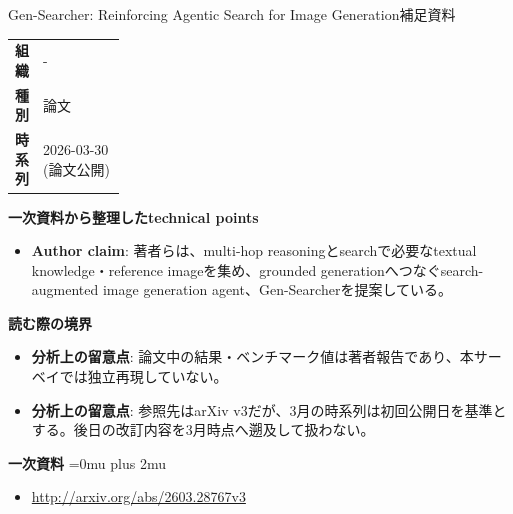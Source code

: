 \begin{technicalnote}{Gen-Searcher: Reinforcing Agentic Search for Image Generation}{補足資料}
\begingroup
\begin{tabularx}{\linewidth}{@{}>{\bfseries}p{0.22\linewidth}X@{}}
組織 & - \\
種別 & 論文 \\
時系列 & 2026-03-30 (論文公開) \\
\end{tabularx}
\smallskip
{\bfseries 一次資料から整理したtechnical points}
\begin{itemize}[leftmargin=1.5em,itemsep=0.35em]
\item \textbf{Author claim}: 著者らは、multi-hop reasoningとsearchで必要なtextual knowledge・reference imageを集め、grounded generationへつなぐsearch-augmented image generation agent、Gen-Searcherを提案している。
\end{itemize}
\begin{minipage}{\linewidth}
{\bfseries 読む際の境界}
\begin{itemize}[leftmargin=1.5em,itemsep=0.35em]
\item \textbf{分析上の留意点}: 論文中の結果・ベンチマーク値は著者報告であり、本サーベイでは独立再現していない。
\item \textbf{分析上の留意点}: 参照先はarXiv v3だが、3月の時系列は初回公開日を基準とする。後日の改訂内容を3月時点へ遡及して扱わない。
\end{itemize}
\begin{samepage}
{\bfseries 一次資料}
\begingroup\sloppy
\Urlmuskip=0mu plus 2mu\relax
\begin{itemize}[leftmargin=1.5em,itemsep=0.25em]
\item {\scriptsize\url{http://arxiv.org/abs/2603.28767v3}}
\end{itemize}
\endgroup
\end{samepage}
\end{minipage}
\endgroup
\end{technicalnote}
\medskip
